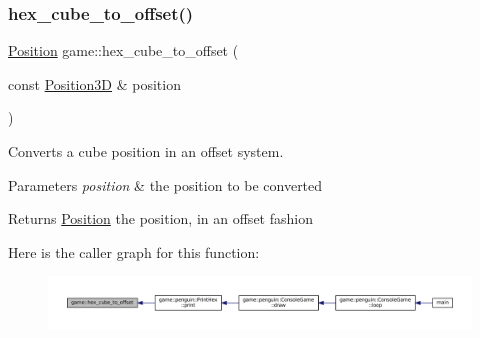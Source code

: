 \subsubsection{\texorpdfstring{hex\+\_\+cube\+\_\+to\+\_\+offset()}{hex\_cube\_to\_offset()}}
{\footnotesize\ttfamily \hyperlink{structgame_1_1_position}{Position} game\+::hex\+\_\+cube\+\_\+to\+\_\+offset (\begin{DoxyParamCaption}\item[{const \hyperlink{structgame_1_1_position3_d}{Position3D} \&}]{position }\end{DoxyParamCaption})}



Converts a cube position in an offset system. 


\begin{DoxyParams}{Parameters}
{\em position} & the position to be converted \\
\hline
\end{DoxyParams}
\begin{DoxyReturn}{Returns}
\hyperlink{structgame_1_1_position}{Position} the position, in an offset fashion 
\end{DoxyReturn}
Here is the caller graph for this function\+:
\nopagebreak
\begin{figure}[H]
\begin{center}
\leavevmode
\includegraphics[width=350pt]{namespacegame_a0fb03836882da582210ce59b390ad61f_icgraph}
\end{center}
\end{figure}
